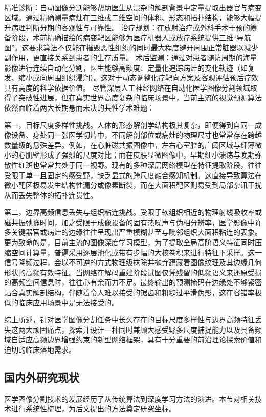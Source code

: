 \documentclass[12pt, a4paper, twoside]{article}
\begin{document}
精准诊断：自动图像分割能够帮助医生从混杂的解剖背景中定量提取出器官与病变区域。通过精确测量病灶在三维或二维空间的体积、形态和拓扑结构，能够大幅提升病理判断分期的客观性与可靠性。
治疗规划：在放射治疗或外科手术干预的筹备阶段，术前精确描绘的病变靶区能够为医疗机器人或放疗系统提供三维“导航图”。这要求算法不仅能在摧毁恶性组织的同时最大程度避开周围正常脏器以减少副作用，更直接关系到患者的生存质量。
术后监测：通过对患者随访周期的海量影像进行连续自动化分割，医生能够高频度、定量化追踪病灶的变化轨迹（如复发、缩小或向周围组织浸润）。这对于动态调整化疗靶向方案及客观评估预后疗效具有高度的科学依据价值。
尽管深层人工神经网络在自动化医学图像分割领域取得了突破性进展，但在真实世界高度复杂的临床场景中，当前主流的视觉预测算法依然面临着两大长期悬而未决的共性学术难题：

第一，目标尺度多样性挑战。人体的形态解剖学结构极其复杂，即便得到自同一成像设备、身处同一张医学切片中，不同解剖部位或病灶的物理尺寸也常常存在跨越数量级的悬殊差异。例如，在心脏磁共振图像中，左右心室腔的广阔区域与纤薄微小的心肌壁形成了强烈的尺度对比；而在皮肤显微图像中，早期细小溃疡与晚期弥散性红斑也常常共处于同一视野。现有的多种深层网络模型在特征提取阶段，往往受限于单一且固定的感受野，缺乏显式的跨尺度融合感知机制。这直接导致算法在微小靶区极易发生结构性漏分或像素断裂，而在大面积靶区则易受到局部杂讯干扰从而丢失整体的拓扑连贯性。

第二，边界高频信息丢失与组织粘连挑战。受限于软组织相近的物理射线吸收率或磁共振弛豫时间，加之受限于成像设备的固有热噪声与伪相分辨率，医学影像中许多关键器官或病灶的边缘往往呈现出严重模糊甚至与毗邻组织大面积粘连的表象。更为致命的是，目前主流的图像深度学习模型，为了提取全局高阶语义特征同时压缩空间计算量，普遍采用逐层池化或带有步幅的大核卷积来进行特征下采样。这一信号降频过程，会以不可逆的方式物理级抹除并抛弃蕴藏着图像纹理及其边缘几何形状的高频有效特征。当网络在解码重建阶段试图仅凭残留的低频语义来还原受损的高频空间信息时，往往心有余而力不足。最终输出的预测掩码在边缘处不够紧密贴合真实解剖结构，伴随着令人难以接受的锯齿和粗糙过平滑伪影，这在容错率极低的临床应用场景中是无法接受的。

综上所述，针对医学图像分割任务中长久存在的目标尺度多样性与边界高频特征丢失这两大顽固痛点，探索并设计一种同时兼顾大感受野多尺度捕捉能力以及具备频域自适应高频边界增强约束的新型网络框架，具有十分重要的前沿理论探索价值和迫切的临床落地需求。

\subsection{国内外研究现状}

医学图像分割技术的发展经历了从传统算法到深度学习方法的演进。本节对相关技术进行系统性梳理，为后文提出的方法奠定研究坐标。
\end{document}
